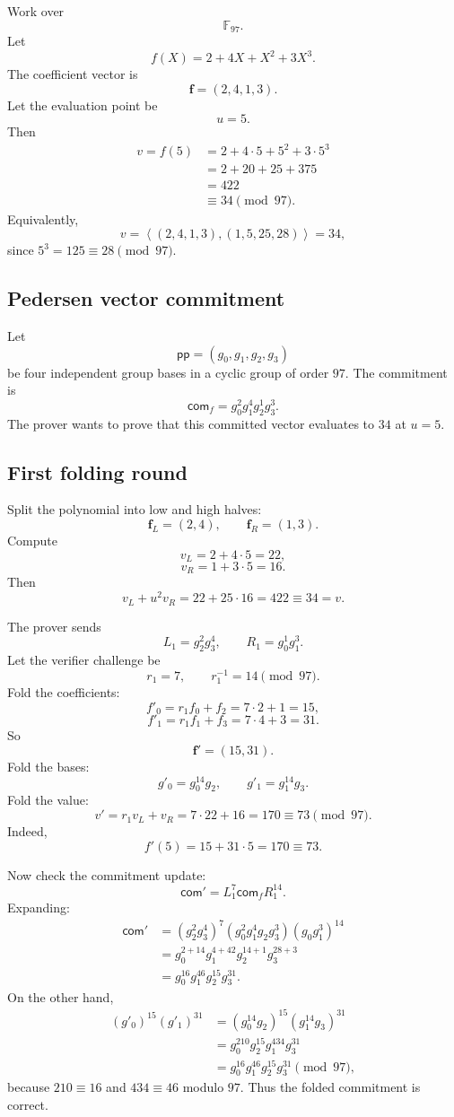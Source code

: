 \documentclass[11pt]{article}
\newcommand{\F}{\mathbb{F}}
\newcommand{\pp}{\mathsf{pp}}
\newcommand{\iprod}[2]{\left\langle #1,#2\right\rangle}
\begin{document}
Work over
\[
    \F_{97}.
\]
Let
\[
    f(X)=2+4X+X^2+3X^3.
\]
The coefficient vector is
\[
    \mathbf f=(2,4,1,3).
\]
Let the evaluation point be
\[
    u=5.
\]
Then
\[
\begin{aligned}
    v=f(5)
    &=2+4\cdot 5+5^2+3\cdot 5^3\\
    &=2+20+25+375\\
    &=422\\
    &\equiv 34\pmod{97}.
\end{aligned}
\]
Equivalently,
\[
    v=\iprod{(2,4,1,3)}{(1,5,25,28)}=34,
\]
since $5^3=125\equiv 28\pmod{97}$.

\subsection{Pedersen vector commitment}

Let
\[
    \pp=(g_0,g_1,g_2,g_3)
\]
be four independent group bases in a cyclic group of order $97$. The commitment is
\[
    \mathsf{com}_f=g_0^2g_1^4g_2^1g_3^3.
\]
The prover wants to prove that this committed vector evaluates to $34$ at $u=5$.

\subsection{First folding round}

Split the polynomial into low and high halves:
\[
    \mathbf f_L=(2,4),
    \qquad
    \mathbf f_R=(1,3).
\]
Compute
\[
    v_L=2+4\cdot 5=22,
\]
\[
    v_R=1+3\cdot 5=16.
\]
Then
\[
    v_L+u^2v_R=22+25\cdot 16=422\equiv 34=v.
\]

The prover sends
\[
    L_1=g_2^2g_3^4,
    \qquad
    R_1=g_0^1g_1^3.
\]
Let the verifier challenge be
\[
    r_1=7,
    \qquad
    r_1^{-1}=14\pmod{97}.
\]
Fold the coefficients:
\[
    f'_0=r_1f_0+f_2=7\cdot 2+1=15,
\]
\[
    f'_1=r_1f_1+f_3=7\cdot 4+3=31.
\]
So
\[
    \mathbf f'=(15,31).
\]
Fold the bases:
\[
    g'_0=g_0^{14}g_2,
    \qquad
    g'_1=g_1^{14}g_3.
\]
Fold the value:
\[
    v'=r_1v_L+v_R=7\cdot22+16=170\equiv 73\pmod{97}.
\]
Indeed,
\[
    f'(5)=15+31\cdot5=170\equiv 73.
\]

Now check the commitment update:
\[
    \mathsf{com}'=L_1^{7}\mathsf{com}_fR_1^{14}.
\]
Expanding:
\[
\begin{aligned}
\mathsf{com}'
&=(g_2^2g_3^4)^7(g_0^2g_1^4g_2g_3^3)(g_0g_1^3)^{14}\\
&=g_0^{2+14}g_1^{4+42}g_2^{14+1}g_3^{28+3}\\
&=g_0^{16}g_1^{46}g_2^{15}g_3^{31}.
\end{aligned}
\]
On the other hand,
\[
\begin{aligned}
(g'_0)^{15}(g'_1)^{31}
&=(g_0^{14}g_2)^{15}(g_1^{14}g_3)^{31}\\
&=g_0^{210}g_2^{15}g_1^{434}g_3^{31}\\
&=g_0^{16}g_1^{46}g_2^{15}g_3^{31}\pmod{97},
\end{aligned}
\]
because $210\equiv16$ and $434\equiv46$ modulo $97$. Thus the folded commitment is correct.
\end{document}
